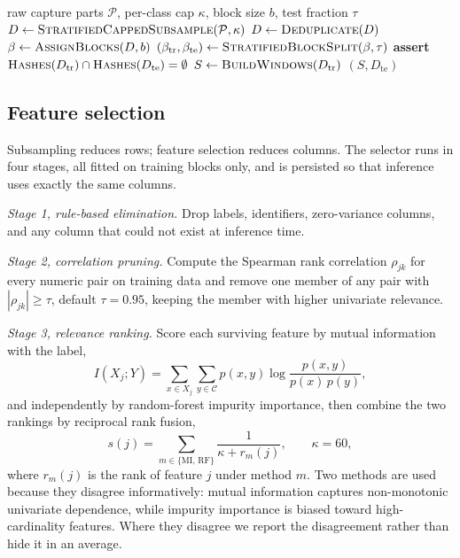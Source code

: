 \documentclass[conference]{IEEEtran}
\begin{document}
\begin{algorithm}[t]
\caption{Leakage-controlled preparation}\label{alg:prep}
\begin{algorithmic}[1]
\Require raw capture parts $\mathcal{P}$, per-class cap $\kappa$, block size $b$, test fraction $\tau$
\State $D \gets \textsc{StratifiedCappedSubsample}(\mathcal{P}, \kappa)$
\State $D \gets \textsc{Deduplicate}(D)$ 
\State $\beta \gets \textsc{AssignBlocks}(D, b)$ 
\State $(\beta_{\text{tr}}, \beta_{\text{te}}) \gets \textsc{StratifiedBlockSplit}(\beta, \tau)$
\State \textbf{assert} $\textsc{Hashes}(D_{\text{tr}}) \cap \textsc{Hashes}(D_{\text{te}}) = \emptyset$
\State $S \gets \textsc{BuildWindows}(D_{\text{tr}})$ 
\State \Return $(S, D_{\text{te}})$
\end{algorithmic}
\end{algorithm}

\subsection{Feature selection}\label{sec:features}
Subsampling reduces rows; feature selection reduces columns. The selector runs in four
stages, all fitted on training blocks only, and is persisted so that inference uses exactly the
same columns.

\emph{Stage 1, rule-based elimination.} Drop labels, identifiers, zero-variance columns, and any
column that could not exist at inference time.

\emph{Stage 2, correlation pruning.} Compute the Spearman rank correlation $\rho_{jk}$ for every
numeric pair on training data and remove one member of any pair with $|\rho_{jk}| \ge \tau$,
default $\tau = 0.95$, keeping the member with higher univariate relevance.

\emph{Stage 3, relevance ranking.} Score each surviving feature by mutual information with the
label,
\begin{equation}
I(X_j; Y) = \sum_{x \in X_j} \sum_{y \in \mathcal{C}} p(x,y)
\log \frac{p(x,y)}{p(x)\,p(y)},
\label{eq:mi}
\end{equation}
and independently by random-forest impurity importance, then combine the two rankings by
reciprocal rank fusion,
\begin{equation}
s(j) = \sum_{m \in \{\text{MI},\,\text{RF}\}} \frac{1}{\kappa + r_m(j)}, \qquad \kappa = 60,
\label{eq:rrf}
\end{equation}
where $r_m(j)$ is the rank of feature $j$ under method $m$. Two methods are used because they
disagree informatively: mutual information captures non-monotonic univariate dependence, while
impurity importance is biased toward high-cardinality features. Where they disagree we report the
disagreement rather than hide it in an average.
\end{document}
